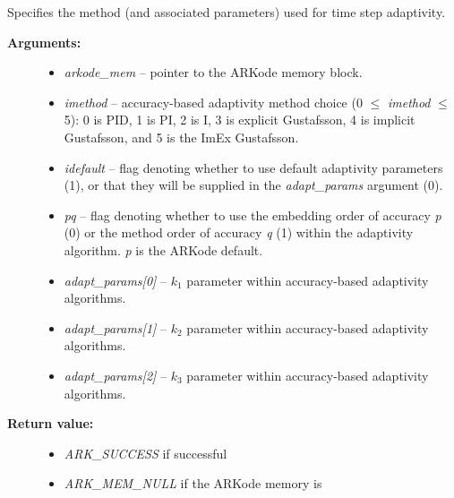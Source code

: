 \documentclass[letterpaper,10pt,english]{sphinxmanual}
\begin{document}
\begin{fulllineitems}
\label{c_interface/User_callable:c.ARKodeSetAdaptivityMethod}
Specifies the method (and associated parameters) used for time step adaptivity.
\begin{description}
\item[{\textbf{Arguments:}}] \leavevmode\begin{itemize}
\item {} 
\emph{arkode\_mem} -- pointer to the ARKode memory block.

\item {} 
\emph{imethod} -- accuracy-based adaptivity method choice
(0 \(\le\) \emph{imethod} \(\le\) 5):
0 is PID, 1 is PI, 2 is I, 3 is explicit Gustafsson, 4 is
implicit Gustafsson, and 5 is the ImEx Gustafsson.

\item {} 
\emph{idefault} -- flag denoting whether to use default adaptivity
parameters (1), or that they will be supplied in the
\emph{adapt\_params} argument (0).

\item {} 
\emph{pq} -- flag denoting whether to use the embedding order of
accuracy \emph{p} (0) or the method order of accuracy \emph{q} (1)
within the adaptivity algorithm.  \emph{p} is the ARKode default.

\item {} 
\emph{adapt\_params{[}0{]}} -- \(k_1\) parameter within accuracy-based adaptivity algorithms.

\item {} 
\emph{adapt\_params{[}1{]}} -- \(k_2\) parameter within accuracy-based adaptivity algorithms.

\item {} 
\emph{adapt\_params{[}2{]}} -- \(k_3\) parameter within accuracy-based adaptivity algorithms.

\end{itemize}

\item[{\textbf{Return value:}}] \leavevmode\begin{itemize}
\item {} 
\emph{ARK\_SUCCESS} if successful

\item {} 
\emph{ARK\_MEM\_NULL} if the ARKode memory is 


\end{itemize}
\end{description}
\end{fulllineitems}
\end{document}
